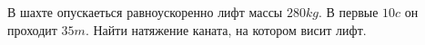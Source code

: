 В шахте опускаеться равноускоренно лифт массы $280 kg$. В первые $10 c$
он проходит $35 m$. Найти натяжение каната, на котором висит лифт.
